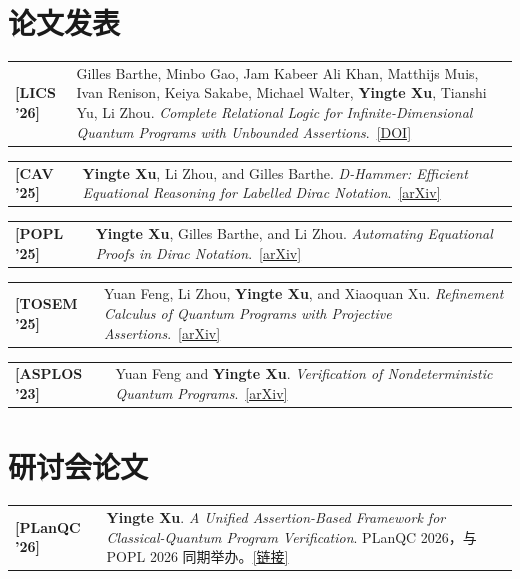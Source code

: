 \documentclass[11pt,a4paper]{moderncv}
\makeatletter
\newcommand*{\publication}[2]{%
  \begin{tabular*}{\maincolumnwidth}{%
    @{}p{2.6cm}@{}>{\raggedright\arraybackslash}p{\dimexpr\maincolumnwidth-2.6cm\relax}@{}}%
    {\bfseries #1} & #2\\%
  \end{tabular*}%
  \par\addvspace{.5em}}
\makeatother
\begin{document}

{
}





\section{论文发表}

\publication{[LICS '26]}{Gilles Barthe, Minbo Gao, Jam Kabeer Ali Khan, Matthijs Muis, Ivan Renison, Keiya Sakabe, Michael Walter, \textbf{Yingte Xu}, Tianshi Yu, Li Zhou. \emph{Complete Relational Logic for Infinite-Dimensional Quantum Programs with Unbounded Assertions}.~\href{https://drops.dagstuhl.de/entities/document/10.4230/LIPIcs.LICS.2026.15}{[DOI]}}

\publication{[CAV '25]}{\textbf{Yingte Xu}, Li Zhou, and Gilles Barthe. \emph{D-Hammer: Efficient Equational Reasoning for Labelled Dirac Notation}.~\href{https://arxiv.org/abs/2505.08633}{[arXiv]}}

\publication{[POPL '25]}{\textbf{Yingte Xu}, Gilles Barthe, and Li Zhou. \emph{Automating Equational Proofs in Dirac Notation}.~\href{https://arxiv.org/abs/2411.11617}{[arXiv]}}

\publication{[TOSEM '25]}{Yuan Feng, Li Zhou, \textbf{Yingte Xu}, and Xiaoquan Xu. \emph{Refinement Calculus of Quantum Programs with Projective Assertions}.~\href{https://arxiv.org/abs/2311.14215}{[arXiv]}}

\publication{[ASPLOS '23]}{Yuan Feng and \textbf{Yingte Xu}. \emph{Verification of Nondeterministic Quantum Programs}.~\href{https://arxiv.org/abs/2302.07973}{[arXiv]}}



\section{研讨会论文}

\publication{[PLanQC '26]}{\textbf{Yingte Xu}. \emph{A Unified Assertion-Based Framework for Classical-Quantum Program Verification}. PLanQC 2026，与 POPL 2026 同期举办。\href{https://popl26.sigplan.org/details/planqc-2026-papers/5/A-Unified-Assertion-Based-Framework-for-Classical-Quantum-Program-Verification}{[链接]}}
\end{document}
